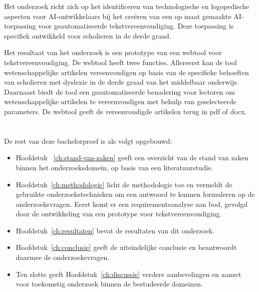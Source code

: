Het onderzoek richt zich op het identificeren van technologische en logopedische aspecten voor AI-ontwikkelaars bij het creëren van een op maat gemaakte AI-toepassing voor geautomatiseerde tekstvereenvoudiging. Deze toepassing is specifiek ontwikkeld voor scholieren in de derde graad.

\medspace

Het resultaat van het onderzoek is een prototype van een webtool voor tekstvereenvoudiging. De webtool heeft twee functies. Allereerst kan de tool wetenschappelijke artikelen vereenvoudigen op basis van de specifieke behoeften van scholieren met dyslexie in de derde graad van het middelbaar onderwijs. Daarnaast biedt de tool een geautomatiseerde benadering voor lectoren om wetenschappelijke artikelen te vereenvoudigen met behulp van geselecteerde parameters. De webtool geeft de vereenvoudigde artikelen terug in pdf of docx. 

\section{}%
\label{sec:opzet-bachelorproef}

De rest van deze bachelorproef is als volgt opgebouwd:

\begin{itemize}
	\item Hoofdstuk ~\ref{ch:stand-van-zaken} geeft een overzicht van de stand van zaken binnen het onderzoeksdomein, op basis van een literatuurstudie.
	\item Hoofdstuk~\ref{ch:methodologie} licht de methodologie toe en vermeldt de gebruikte onderzoekstechnieken om een antwoord te kunnen formuleren op de onderzoeksvragen. Eerst komt er een requirementsanalyse aan bod, gevolgd door de ontwikkeling van een prototype voor tekstvereenvoudiging. 
	\item Hoofdstuk~\ref{ch:resultaten} bevat de resultaten van dit onderzoek. 
	\item Hoofdstuk~\ref{ch:conclusie} geeft de uiteindelijke conclusie en beantwoordt daarmee de onderzoeksvragen.
	\item Ten slotte geeft Hoofdstuk~\ref{ch:discussie} verdere aanbevelingen en aanzet voor toekomstig onderzoek binnen de bestudeerde domeinen. 
\end{itemize}
